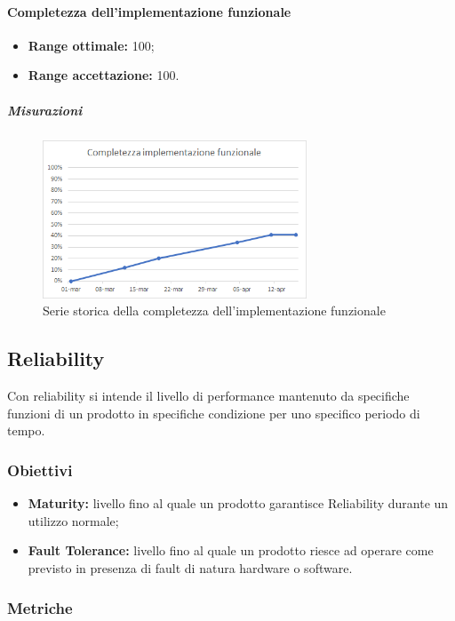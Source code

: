 			\paragraph{Completezza dell'implementazione funzionale}\Spazio
			\begin{itemize}
				\item {\textbf{Range ottimale:} 100;}
				\item {\textbf{Range accettazione:} 100.}
			\end{itemize} 
            \subparagraph{Misurazioni}
            \begin{figure}[H]
            	\centering 
            	\includegraphics[width=0.7\textwidth]{Images/completezza-funzionale.png}
            	\caption{Serie storica della completezza dell'implementazione funzionale}
            	\label{cf} 
            \end{figure}
	\subsection{Reliability}
		Con reliability si intende il livello di performance mantenuto da specifiche funzioni di un prodotto in specifiche condizione per uno specifico periodo di tempo.
		\subsubsection{Obiettivi}
		\begin{itemize}
			\item {\textbf{Maturity:} livello fino al quale un prodotto garantisce Reliability durante un utilizzo normale;}
			\item {\textbf{Fault Tolerance:} livello fino al quale un prodotto riesce ad operare come previsto in presenza di fault di natura hardware o software.}
		\end{itemize}
		\subsubsection{Metriche}
